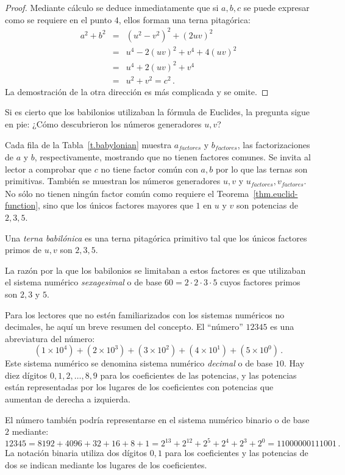 \begin{proof}
Mediante cálculo se deduce inmediatamente que si $ {a,b,c}$ se puede expresar como se requiere en el punto $4$, ellos forman una terna pitagórica:
\begin{eqnarray*}
a^2+b^2&=&(u^2-v^2)^2 + (2uv)^2\\
&=& u^4-2(uv)^2+v^4+4(uv)^2\\
&=&u^4+2(uv)^2+v^4\\
&=&u^2+v^2=c^2\,.
\end{eqnarray*}
La demostración de la otra dirección es más complicada y se omite.
\end{proof}
Si es cierto que los babilonios utilizaban la fórmula de Euclides, la pregunta sigue en pie: ¿Cómo descubrieron los números generadores $u,v$?

Cada fila de la Tabla~\ref{t.babylonian} muestra $a_{\textit{factores}}$ y $b_{\textit{factores}}$, las factorizaciones de $a$ y $b$, respectivamente, mostrando que no tienen factores comunes. Se invita al lector a comprobar que $c$ no tiene factor común con $a,b$ por lo que las ternas son primitivas. También se muestran los números generadores $u,v$ y $u_{\textit{factores}}, v_{\textit{factores}}$. No sólo no tienen ningún factor común como requiere el Teorema~\ref{thm.euclid-function}, sino que los únicos factores mayores que $1$ en $u$ y $v$ son potencias de $2,3,5$.
\begin{definition}
Una \emph{terna babilónica} es una terna pitagórica primitivo tal que los únicos factores primos de $u,v$ son $2,3,5$.
\end{definition}
La razón por la que los babilonios se limitaban a estos factores es que utilizaban el sistema numérico \emph{sexagesimal} o de base $60=2\cdot 2\cdot 3\cdot 5$ cuyos factores primos son $2,3$ y $5$.

Para los lectores que no estén familiarizados con los sistemas numéricos no decimales, he aquí un breve resumen del concepto. El ``número'' $12345$ es una abreviatura del número:
\[
(1\times 10^4) + (2\times 10^3) + (3\times 10^2) + (4\times 10^1) + (5\times 10^0)\,.
\]
Este sistema numérico se denomina sistema numérico \emph{decimal} o de base $10$. Hay diez dígitos $0,1,2,\ldots,8,9$ para los coeficientes de las potencias, y las potencias están representadas por los lugares de los coeficientes con potencias que aumentan de derecha a izquierda. 

El número también podría representarse en el sistema numérico binario o de base $2$ mediante:
\[
12345=8192 + 4096 + 32+16+8+1=
2^{13} + 2^{12} + 2^{5} + 2^{4} + 2^{3} + 2^0=11000000111001\,.
\]
La notación binaria utiliza dos dígitos $0,1$ para los coeficientes y las potencias de dos se indican mediante los lugares de los coeficientes.

